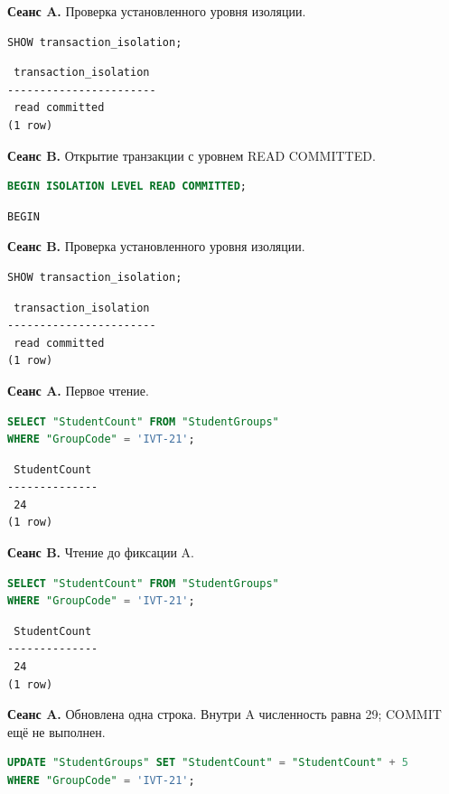 \documentclass[12pt,a4paper]{article}
\begin{document}
\textbf{Сеанс A.} Проверка установленного уровня изоляции.
\begin{lstlisting}[language=SQL]
SHOW transaction_isolation;
\end{lstlisting}

\begin{lstlisting}
 transaction_isolation
-----------------------
 read committed
(1 row)
\end{lstlisting}

\textbf{Сеанс B.} Открытие транзакции с уровнем READ COMMITTED.
\begin{lstlisting}[language=SQL]
BEGIN ISOLATION LEVEL READ COMMITTED;
\end{lstlisting}

\begin{lstlisting}
BEGIN
\end{lstlisting}

\textbf{Сеанс B.} Проверка установленного уровня изоляции.
\begin{lstlisting}[language=SQL]
SHOW transaction_isolation;
\end{lstlisting}

\begin{lstlisting}
 transaction_isolation
-----------------------
 read committed
(1 row)
\end{lstlisting}

\textbf{Сеанс A.} Первое чтение.
\begin{lstlisting}[language=SQL]
SELECT "StudentCount" FROM "StudentGroups"
WHERE "GroupCode" = 'IVT-21';
\end{lstlisting}

\begin{lstlisting}
 StudentCount
--------------
 24
(1 row)
\end{lstlisting}

\textbf{Сеанс B.} Чтение до фиксации A.
\begin{lstlisting}[language=SQL]
SELECT "StudentCount" FROM "StudentGroups"
WHERE "GroupCode" = 'IVT-21';
\end{lstlisting}

\begin{lstlisting}
 StudentCount
--------------
 24
(1 row)
\end{lstlisting}

\textbf{Сеанс A.} Обновлена одна строка. Внутри A численность равна 29; COMMIT ещё не выполнен.
\begin{lstlisting}[language=SQL]
UPDATE "StudentGroups" SET "StudentCount" = "StudentCount" + 5
WHERE "GroupCode" = 'IVT-21';
\end{lstlisting}
\end{document}
